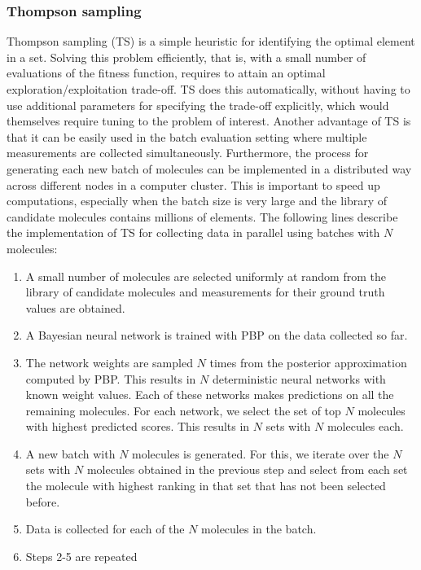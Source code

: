 \subsubsection{Thompson sampling}

Thompson sampling (TS) \cite{Thompson_1933} is a simple heuristic for identifying the optimal element in a set. Solving this problem efficiently, that is, with a small number of evaluations of the fitness function, requires to attain an optimal exploration/exploitation trade-off. TS does this automatically, without having to use additional parameters for specifying the trade-off explicitly, which would themselves require tuning to the problem of interest. Another advantage of TS is that it can be easily used
in the batch evaluation setting where multiple measurements are collected simultaneously. Furthermore, the process for generating each new batch of molecules can be implemented in a distributed way across different nodes in a computer cluster. This is important to speed up computations, especially when the batch size is very large and the library of candidate molecules contains millions of elements. The following lines describe the implementation of TS for collecting data in parallel using batches with $N$ molecules:
\begin{enumerate}
\item A small number of molecules are selected uniformly at random from the library of candidate molecules and measurements for their ground truth values are obtained.
\item A Bayesian neural network is trained with PBP on the data collected so far.
\item The network weights are sampled $N$ times from the posterior approximation computed by PBP. This results in $N$ deterministic neural networks with known weight values. Each of these networks makes predictions on all the remaining molecules. For each network, we select the set of top $N$ molecules with highest predicted scores. This results in $N$ sets with $N$ molecules each.
\item A new batch with $N$ molecules is generated. For this, we iterate over the $N$ sets with $N$ molecules obtained in the previous step and select from each set the molecule with highest ranking in that set that has not been selected before.
\item Data is collected for each of the $N$ molecules in the batch.
\item Steps 2-5 are repeated
\end{enumerate}

